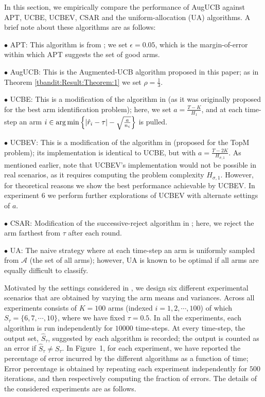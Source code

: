 
In this section, we empirically compare the  performance of AugUCB against APT, UCBE, UCBEV, CSAR and the uniform-allocation (UA) algorithms. A brief note about these algorithms are as follows:

$\bullet$ APT: This algorithm is from \cite{locatelli2016optimal}; we set $\epsilon=0.05$, which is the margin-of-error within which APT suggests the set of good arms.

$\bullet$ AugUCB: This is the Augmented-UCB algorithm proposed in this paper; as in Theorem \ref{tbandit:Result:Theorem:1} we set $\rho=\frac{1}{3}$.

$\bullet$ UCBE: This is a modification of the algorithm in \cite{audibert2009exploration} (as it was originally proposed for the best arm identification problem); here, we set $a=\frac{T-K}{H_1}$, and at each time-step an arm $i\in\operatorname*{arg\,min}\left\lbrace |\hat{r}_{i} -\tau|-\sqrt{\frac{a}{n_{i}}} \right\rbrace$ is pulled.

$\bullet$ UCBEV: This is a modification of the algorithm in \cite{gabillon2011multi} (proposed for the TopM problem); its implementation is identical to UCBE, but with $a = \frac{T-2K}{H_{\sigma,1}}$. As mentioned earlier, note that UCBEV's implementation would not be possible in real scenarios, as it requires computing the problem complexity $H_{\sigma,1}$. However, for theoretical reasons we show the best performance achievable by UCBEV. In experiment 6 we perform further explorations of UCBEV with alternate settings of $a$.

$\bullet$ CSAR:  Modification of the successive-reject algorithm in \cite{chen2014combinatorial}; here, we reject the arm farthest from $\tau$ after each round. 

$\bullet$ UA: The naive strategy where at each time-step an arm is uniformly sampled from $\mathcal{A}$ (the set of all arms); however, UA is known to be optimal if all arms are equally difficult to classify. 


\noindent
Motivated by the settings considered in \cite{locatelli2016optimal}, 
we design six different experimental scenarios that are obtained by varying the arm means and variances.  Across all experiments consists of $K=100$  arms (indexed $i=1,2,\cdots,100$) of which ${S}_\tau=\{6,7,\cdots,10\}$, where we have fixed $\tau=0.5$. In all the experiments, each algorithm is run independently for $10000$ time-steps. At every time-step, the output set,  $\hat{S}_\tau$, suggested by each algorithm is recorded; the output is counted as an error if $\hat{S}_\tau\ne S_\tau$. In Figure~1, for each experiment, we have reported the percentage of error incurred by the different algorithms as a function of time; Error percentage is obtained by repeating each experiment independently  for $500$ iterations, and then respectively computing the fraction of errors. The details of the considered experiments are as follows.

